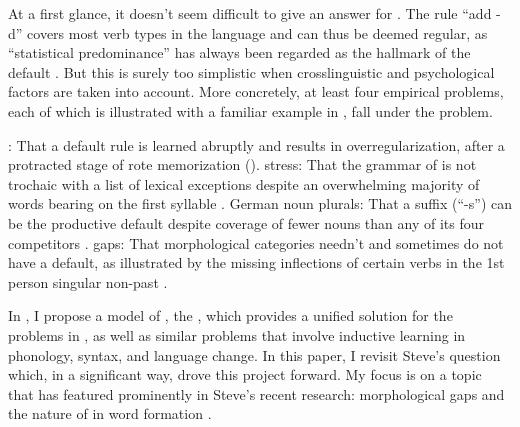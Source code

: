 \documentclass[output=paper,
modfonts
]{LSP/langsci}
\begin{document}
At a
first glance, it 
doesn't seem difficult to give an answer for   . The
rule ``add -d'' covers most verb types in the language and can thus be
deemed regular,  
as   ``statistical predominance'' has always been regarded as the hallmark of
the default  \citep[e.g.,][14]{Nida1949}. But this is surely
too simplistic when crosslinguistic and psychological factors
are taken into account.  More 
concretely, at least four empirical problems, each of which is
illustrated with a familiar example in ,  fall under the
 problem. 
\begin{exe} \ex \label{four}
\begin{xlist} 
\ex {} : That a default rule is learned abruptly and
results in overregularization,  after 
a protracted stage of rote memorization (\citealt{Marcus1992, KLNL}). 
\ex {} stress: That the grammar of    \citep{SPE,
  Hayes1982, Halle1987}  is not trochaic with a list of lexical
exceptions despite an overwhelming majority of 
words bearing  on the first syllable  \citep{Cutler1987,
  LY2013}.  
\ex German noun plurals: That a suffix (``-s'') can be the productive
default despite coverage of fewer nouns than any of its four
competitors
 \citep{Clahsen1992, Wiese1996}. 
\ex {} gaps: That morphological categories needn't and sometimes
do not have a default, as illustrated by the missing inflections of
certain  verbs in the 1st person singular non-past \citep{Halle1973a}. 
\end{xlist} \end{exe}


In \citet{POP}, I propose a model of , the 
, which provides a unified solution for 
the problems in , as well as 
similar problems that involve inductive learning in phonology, syntax,
and language change. In this paper, I revisit Steve's question which,
in a significant way, drove this project forward. My focus is on 
a topic that has featured prominently in Steve's recent research:
morphological gaps and the nature of  in word formation
\citep[e.g.,][]{Anderson2008, 
  Anderson2010b}.   
\end{document}
